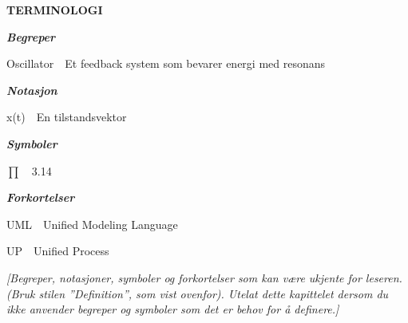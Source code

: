 \documentclass[../main.tex]{subfiles}
\begin{document}
{\bfseries \Large TERMINOLOGI}

\bigskip

{\bfseries\itshape
Begreper}

{
Oscillator\ \ Et feedback system som bevarer energi med resonans}

{\bfseries\itshape
Notasjon}

{
x(t)\ \ En tilstandsvektor}

{\bfseries\itshape
Symboler}

{
${\prod}$\ \ 3.14}

{\bfseries\itshape
Forkortelser}

{
UML\ \ Unified Modeling Language}

{
UP\ \ Unified Process}


\bigskip

{\itshape\color{blue}
[Begreper, notasjoner, symboler og forkortelser som kan v{\ae}re ukjente for leseren. (Bruk stilen ''Definition'', som
vist ovenfor). Utelat dette kapittelet dersom du ikke anvender begreper og symboler som det er behov for {\aa}
definere.]}

\bigskip
\end{document}
